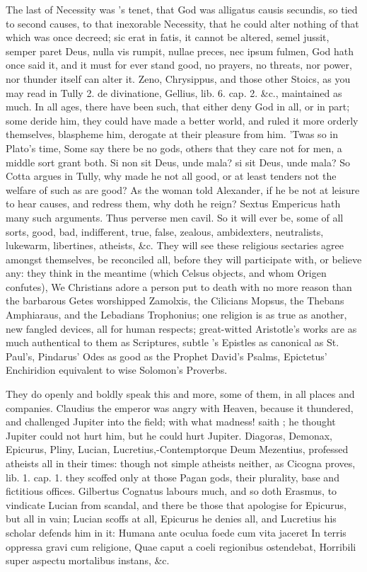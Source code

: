 {The last of Necessity was \Seneca's tenet, that God was alligatus causis
secundis, so tied to second causes, to that inexorable Necessity, that
he could alter nothing of that which was once decreed; sic erat in
fatis, it cannot be altered, semel jussit, semper paret Deus, nulla vis
rumpit, nullae preces, nec ipsum fulmen, God hath once said it, and it
must for ever stand good, no prayers, no threats, nor power, nor
thunder itself can alter it. Zeno, Chrysippus, and those other Stoics,
as you may read in Tully 2. de divinatione, Gellius, lib. 6. cap. 2.
\&c., maintained as much. In all ages, there have been such, that either
deny God in all, or in part; some deride him, they could have made a
better world, and ruled it more orderly themselves, blaspheme him,
derogate at their pleasure from him. 'Twas so in Plato's time,
Some say there be no gods, others that they care not for men, a middle
sort grant both. Si non sit Deus, unde mala? si sit Deus, unde mala? So
Cotta argues in Tully, why made he not all good, or at least tenders
not the welfare of such as are good? As the woman told Alexander, if he
be not at leisure to hear causes, and redress them, why doth he reign?
Sextus Empericus hath many such arguments. Thus perverse men
cavil. So it will ever be, some of all sorts, good, bad, indifferent,
true, false, zealous, ambidexters, neutralists, lukewarm, libertines,
atheists, \&c. They will see these religious sectaries agree amongst
themselves, be reconciled all, before they will participate with, or
believe any: they think in the meantime (which Celsus objects,
and whom Origen confutes), We Christians adore a person put to
death with no more reason than the barbarous Getes worshipped
Zamolxis, the Cilicians Mopsus, the Thebans Amphiaraus, and the
Lebadians Trophonius; one religion is as true as another, new fangled
devices, all for human respects; great-witted Aristotle's works are as
much authentical to them as Scriptures, subtle \Seneca's Epistles as
canonical as St. Paul's, Pindarus' Odes as good as the Prophet David's
Psalms, Epictetus' Enchiridion equivalent to wise Solomon's Proverbs.

They do openly and boldly speak this and more, some of them, in all
places and companies. Claudius the emperor was angry with Heaven,
because it thundered, and challenged Jupiter into the field; with what
madness! saith \Seneca; he thought Jupiter could not hurt him, but he
could hurt Jupiter. Diagoras, Demonax, Epicurus, Pliny, Lucian,
Lucretius,-Contemptorque Deum Mezentius, professed atheists all in
their times: though not simple atheists neither, as Cicogna proves,
lib. 1. cap. 1. they scoffed only at those Pagan gods, their plurality,
base and fictitious offices. Gilbertus Cognatus labours much, and so
doth Erasmus, to vindicate Lucian from scandal, and there be those that
apologise for Epicurus, but all in vain; Lucian scoffs at all, Epicurus
he denies all, and Lucretius his scholar defends him in it:
Humana ante oculua foede cum vita jaceret
In terris oppressa gravi cum religione,
Quae caput a coeli regionibus ostendebat,
Horribili super aspectu mortalibus instans, \&c.

}
